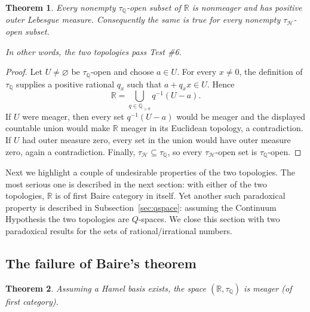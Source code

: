 \documentclass[11pt]{amsart} %
\newtheorem{theorem}{Theorem}[section]
\theoremstyle{definition}
\newcommand{\R}{\mathbb{R}}
\newcommand{\Q}{\mathbb{Q}}
\newcommand{\AD}{\mathcal{H}}
\begin{document}
\begin{theorem} 
Every nonempty \(\tau_{\Q}\)-open subset of \(\R\) is nonmeager and has positive outer Lebesgue measure. Consequently the same is true for every nonempty \(\tau_{\AD}\)-open subset.

In other words, the two topologies pass Test \#6. 
\end{theorem}
\begin{proof} 
Let \(U\ne\varnothing\) be \(\tau_\Q\)-open and choose \(a\in U\). For every \(x\ne0\), the definition of \(\tau_\Q\) supplies a positive rational \(q_x\) such that \(a+q_xx\in U\). Hence
\[
  \R=\bigcup_{q\in\Q_{>0}}q^{-1}(U-a).
\]
If \(U\) were meager, then every set \(q^{-1}(U-a)\) would be meager and the displayed countable union would make \(\R\) meager in its Euclidean topology, a contradiction. If \(U\) had outer measure zero, every set in the union would have outer measure zero, again a contradiction. Finally, \(\tau_{\AD}\subseteq\tau_\Q\), so every \(\tau_{\AD}\)-open set is \(\tau_\Q\)-open. 
\end{proof} 


Next we highlight a couple of undesirable properties of the two topologies. The most serious one is described in the next section: with either of the two topologies, $\mathbb{R}$ is of first Baire category in itself. Yet another such paradoxical property is described in Subsection~\ref{sec:qspace}: assuming the Continuum Hypothesis the two topologies are $Q$-spaces. We close this section with two paradoxical results for the sets of rational/irrational numbers.

\subsection{The failure of Baire's theorem}

\begin{theorem}
\label{thm:7.1}
Assuming a Hamel basis exists, the space $(\mathbb{R}, \tau_{\Q})$ is meager (of first category).
\end{theorem}
\end{document}
